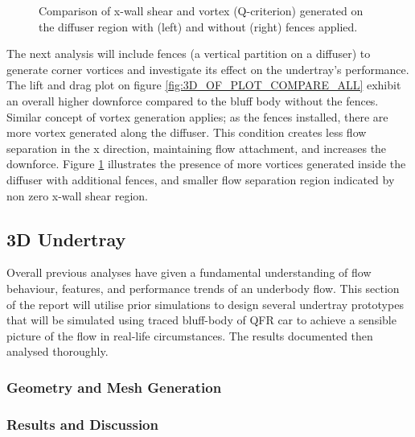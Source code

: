 \begin{figure}[!htb]
    \centering
    \noindent{}
    \caption{Comparison of x-wall shear and vortex (Q-criterion) generated on the diffuser region with (left) and without (right) fences applied.}
    \label{fig:3D_OF_COMPARE_FENCES_SHEAR}
\end{figure}

\noindent The next analysis will include fences (a vertical partition on a diffuser) to generate corner vortices and investigate its effect on the undertray's performance. The lift and drag plot on figure \ref{fig:3D_OF_PLOT_COMPARE_ALL} exhibit an overall higher downforce compared to the bluff body without the fences. Similar  concept of vortex generation applies; as the fences installed, there are more vortex generated along the diffuser. This condition creates less flow separation in the x direction, maintaining flow attachment, and increases the downforce. Figure \ref{fig:3D_OF_COMPARE_FENCES_SHEAR} illustrates the presence of more vortices generated inside the diffuser with additional fences, and smaller flow separation region indicated by non zero x-wall shear region.


\subsection{3D Undertray}
Overall previous analyses have given a fundamental understanding of flow behaviour, features, and performance trends of an underbody flow. This section of the report will utilise prior simulations to design several undertray prototypes that will be simulated using traced bluff-body of QFR car to achieve a sensible picture of the flow in real-life circumstances. The results documented then analysed thoroughly.

\subsubsection{Geometry and Mesh Generation}
\subsubsection{Results and Discussion}




















